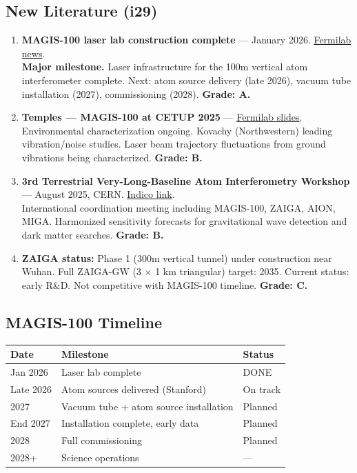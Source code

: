 \documentclass[11pt,a4paper]{article}
\begin{document}
\subsection{New Literature (i29)}

\begin{enumerate}
\item \textbf{MAGIS-100 laser lab construction complete} --- January 2026. \href{https://news.fnal.gov/2026/01/fermilab-completes-laser-lab-construction-for-worlds-largest-vertical-atom-interferometer/}{Fermilab news}.\\
\textbf{Major milestone.} Laser infrastructure for the 100m vertical atom interferometer complete. Next: atom source delivery (late 2026), vacuum tube installation (2027), commissioning (2028). \textbf{Grade: A.}

\item \textbf{Temples --- MAGIS-100 at CETUP 2025} --- \href{https://lss.fnal.gov/archive/2025/slides/fermilab-slides-25-0118-etd.pdf}{Fermilab slides}.\\
Environmental characterization ongoing. Kovachy (Northwestern) leading vibration/noise studies. Laser beam trajectory fluctuations from ground vibrations being characterized. \textbf{Grade: B.}

\item \textbf{3rd Terrestrial Very-Long-Baseline Atom Interferometry Workshop} --- August 2025, CERN. \href{https://indico.cern.ch/event/1522117/}{Indico link}.\\
International coordination meeting including MAGIS-100, ZAIGA, AION, MIGA. Harmonized sensitivity forecasts for gravitational wave detection and dark matter searches. \textbf{Grade: B.}

\item \textbf{ZAIGA status:} Phase 1 (300m vertical tunnel) under construction near Wuhan. Full ZAIGA-GW (3 $\times$ 1 km triangular) target: 2035. Current status: early R\&D. Not competitive with MAGIS-100 timeline. \textbf{Grade: C.}
\end{enumerate}

\subsection{MAGIS-100 Timeline}
\begin{center}
\begin{tabular}{lll}
\toprule
\textbf{Date} & \textbf{Milestone} & \textbf{Status} \\
\midrule
Jan 2026 & Laser lab complete & DONE \\
Late 2026 & Atom sources delivered (Stanford) & On track \\
2027 & Vacuum tube + atom source installation & Planned \\
End 2027 & Installation complete, early data & Planned \\
2028 & Full commissioning & Planned \\
2028+ & Science operations & --- \\
\bottomrule
\end{tabular}
\end{center}
\end{document}
